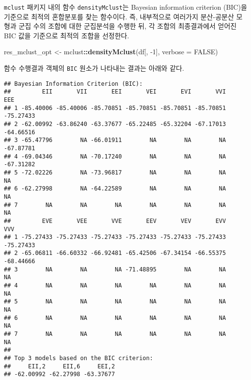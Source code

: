 \documentclass[]{book}
\newenvironment{Shaded}{\begin{snugshade}}{\end{snugshade}}
\newcommand{\DataTypeTok}[1]{\textcolor[rgb]{0.13,0.29,0.53}{#1}}
\newcommand{\DecValTok}[1]{\textcolor[rgb]{0.00,0.00,0.81}{#1}}
\newcommand{\KeywordTok}[1]{\textcolor[rgb]{0.13,0.29,0.53}{\textbf{#1}}}
\newcommand{\NormalTok}[1]{#1}
\newcommand{\OperatorTok}[1]{\textcolor[rgb]{0.81,0.36,0.00}{\textbf{#1}}}
\newcommand{\OtherTok}[1]{\textcolor[rgb]{0.56,0.35,0.01}{#1}}
\newcommand{\StringTok}[1]{\textcolor[rgb]{0.31,0.60,0.02}{#1}}
\begin{document}
\texttt{mclust} 패키지 내의 함수 \texttt{densityMclust}는 Bayesian information criterion (BIC)을 기준으로 최적의 혼합분포를 찾는 함수이다. 즉, 내부적으로 여러가지 분산-공분산 모형과 군집 수의 조합에 대한 군집분석을 수행한 뒤, 각 조합의 최종결과에서 얻어진 BIC 값을 기준으로 최적의 조합을 선정한다.

\begin{Shaded}
\begin{Highlighting}[]
\NormalTok{res_mclust_opt <-}\StringTok{ }\NormalTok{mclust}\OperatorTok{::}\KeywordTok{densityMclust}\NormalTok{(df[, }\DecValTok{-1}\NormalTok{], }\DataTypeTok{verbose =} \OtherTok{FALSE}\NormalTok{)}
\end{Highlighting}
\end{Shaded}

함수 수행결과 객체의 \texttt{BIC} 원소가 나타내는 결과는 아래와 같다.

\begin{Shaded}
\end{Shaded}

\begin{verbatim}
## Bayesian Information Criterion (BIC): 
##         EII       VII       EEI       VEI       EVI       VVI       EEE
## 1 -85.40006 -85.40006 -85.70851 -85.70851 -85.70851 -85.70851 -75.27433
## 2 -62.00992 -63.86240 -63.37677 -65.22485 -65.32204 -67.17013 -64.66516
## 3 -65.47796        NA -66.01911        NA        NA        NA -67.87781
## 4 -69.04346        NA -70.17240        NA        NA        NA -67.31282
## 5 -72.02226        NA -73.96817        NA        NA        NA        NA
## 6 -62.27998        NA -64.22589        NA        NA        NA        NA
## 7        NA        NA        NA        NA        NA        NA        NA
##         EVE       VEE       VVE       EEV       VEV       EVV       VVV
## 1 -75.27433 -75.27433 -75.27433 -75.27433 -75.27433 -75.27433 -75.27433
## 2 -65.06811 -66.60332 -66.92481 -65.42506 -67.34154 -66.55375 -68.44666
## 3        NA        NA        NA -71.48895        NA        NA        NA
## 4        NA        NA        NA        NA        NA        NA        NA
## 5        NA        NA        NA        NA        NA        NA        NA
## 6        NA        NA        NA        NA        NA        NA        NA
## 7        NA        NA        NA        NA        NA        NA        NA
## 
## Top 3 models based on the BIC criterion: 
##     EII,2     EII,6     EEI,2 
## -62.00992 -62.27998 -63.37677
\end{verbatim}
\end{document}
